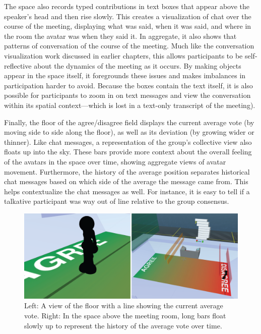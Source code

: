The space also records typed contributions in text boxes that appear above the speaker's head and then rise slowly. This creates a visualization of chat over the course of the meeting, displaying what was said, when it was said, and where in the room the avatar was when they said it. \citep{DiMicco:2007ie} In aggregate, it also shows that patterns of conversation of the course of the meeting. Much like the conversation visualization work discussed in earlier chapters, this allows participants to be self-reflective about the dynamics of the meeting as it occurs. By making objects appear in the space itself, it foregrounds these issues and makes imbalances in participation harder to avoid. Because the boxes contain the text itself, it is also possible for participants to zoom in on text messages and view the conversation within its spatial context---which is lost in a text-only transcript of the meeting).

Finally, the floor of the agree/disagree field displays the current average vote (by moving side to side along the floor), as well as its deviation (by growing wider or thinner). Like chat messages, a representation of the group's collective view also floats up into the sky. These bars provide more context about the overall feeling of the avatars in the space over time, showing aggregate views of avatar movement. Furthermore, the history of the average position separates historical chat messages based on which side of the average the message came from. This helps contextualize the chat messages as well. For instance, it is easy to tell if a talkative participant was way out of line relative to the group consensus.

\begin{figure}[t]
	\includegraphics{figures/average+history.png}
	\caption{Left: A view of the floor with a line showing the current average vote. Right: In the space above the meeting room, long bars float slowly up to represent the history of the average vote over time.}
	\label{fig:information_space_average_history}
\end{figure}

